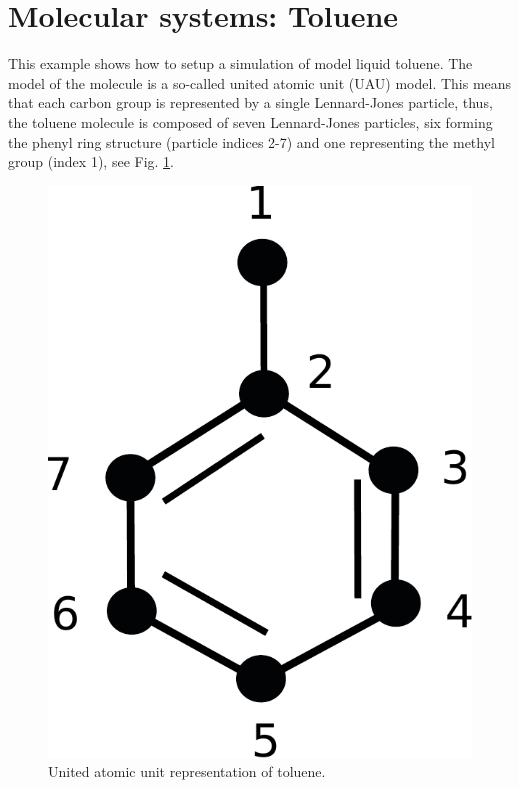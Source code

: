 \documentclass[11pt]{article}
\begin{document}
\section{Molecular systems: Toluene}
This example shows how to setup a simulation of model liquid toluene. The model
of the molecule is a so-called united atomic unit (UAU) model. This means that
each carbon group is represented by a single Lennard-Jones particle, thus, the
toluene molecule is composed of seven Lennard-Jones particles, six forming the
phenyl ring structure (particle indices 2-7) and one representing the methyl
group (index 1), see Fig. \ref{fig:toluene}.
\begin{figure}[h]
  \begin{center}
    \includegraphics[scale=.4]{toluene.pdf}
  \caption{
    \label{fig:toluene}
    United atomic unit representation of toluene.
  }
  \end{center}
\end{figure}
\end{document}
